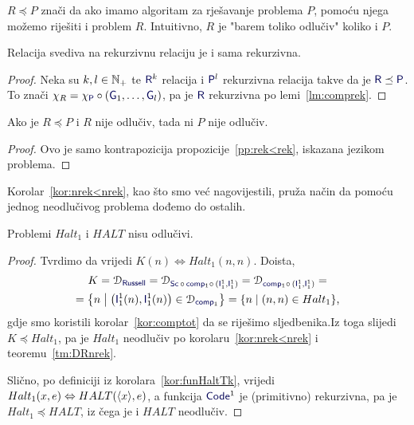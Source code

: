 $R\preceq P$ znači da ako imamo algoritam za rješavanje problema $P$, pomoću njega možemo riješiti i problem $R$. Intuitivno, $R$ je "barem toliko odlučiv" koliko i $P$.

\begin{propozicija}[{name=[svedivost čuva rekurzivnost]}]\label{pp:rek<rek}
Relacija svediva na rekurzivnu relaciju je i sama rekurzivna.
\end{propozicija}
\begin{proof}
Neka su $k,l\in{\mathbb N}_+$ te $\f R^k$ relacija i $\f P^l$ rekurzivna relacija takve da je $\f R\preceq\f P$. To znači $\chi_R=\chi_{\f P}\circ(\f G_1,\dotsc,\f G_l)$, pa je $\f R$ rekurzivna po lemi~\ref{lm:comprek}.
\end{proof}

\begin{korolar}[{name=[inverz svedivosti čuva neodlučivost]}]\label{kor:nrek<nrek}
Ako je $R\preceq P$ i $R$ nije odlučiv, tada ni $P$ nije odlučiv.
\end{korolar}
\begin{proof}
Ovo je samo kontrapozicija propozicije~\ref{pp:rek<rek}, iskazana jezikom problema.
\end{proof}


Korolar~\ref{kor:nrek<nrek}, kao što smo već nagovijestili, pruža način da pomoću jednog neodlučivog problema dođemo do ostalih.

\begin{propozicija}[{name=[neodlučivost problema zaustavljanja za RAM-strojeve]}]\label{pp:Haltnodl}
Problemi $Halt_1$ i $HALT$ nisu odlučivi.
\end{propozicija}
\begin{proof}
Tvrdimo da vrijedi $K(n)\Leftrightarrow Halt_1(n,n)$. Doista,
\begin{multline}
    K=\dom{\f{Russell}}=\dom{\f{Sc}\,\circ\,\f{comp}_1\circ\,(\f I_1^1,\f I_1^1)}=\dom{\f{comp}_1\circ\,(\f I_1^1,\f I_1^1)}=\\
    =\left\{n\;\middle\vert\;\bigl(\f I_1^1(n),\f I_1^1(n)\bigr)\in\dom{\f{comp}_1}\right\}
    =\{n\mid(n,n)\in Halt_1\}\text,
\end{multline}
gdje smo koristili korolar~\ref{kor:comptot} da se riješimo sljedbenika.\newline Iz toga slijedi $K\preceq Halt_1$, pa je $Halt_1$ neodlučiv po korolaru~\ref{kor:nrek<nrek} i teoremu~\ref{tm:DRnrek}.

Slično, po definiciji iz korolara~\ref{kor:funHaltTk}, vrijedi $Halt_1(x,e)\Leftrightarrow HALT(\langle x\rangle,e)$, a funkcija $\f{Code}^1$ je (primitivno) rekurzivna, pa je $Halt_1\!\preceq HALT$, iz čega je i $HALT$ neodlučiv.
\end{proof}

